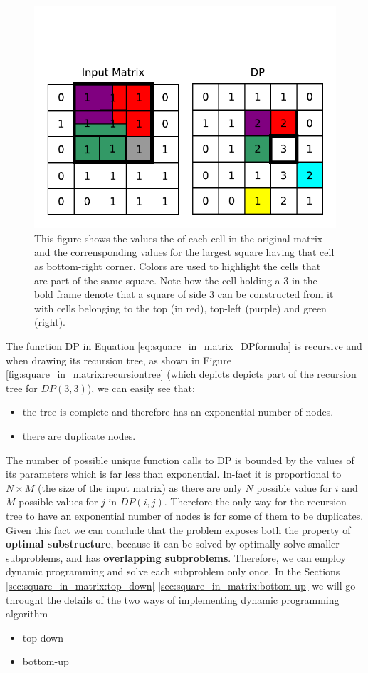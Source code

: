 \begin{figure}
	\centering
	\label{fig:square_in_matrix:square_DP_example}
	\includegraphics[]{sources/square_in_matrix/images/square_DP_example}
	\caption{This figure shows the values the of each cell in the original matrix and the
	corrensponding values for the largest square having that cell as bottom-right corner. Colors are
	used to highlight the cells that are part of the same square. Note how the cell holding a $3$ in
	the bold frame denote that a square of side $3$ can be constructed from it with cells belonging
	to the top (in red), top-left (purple) and green (right). }
\end{figure}

The function DP in Equation \ref{eq:square_in_matrix_DPformula} is recursive and when drawing its
recursion tree, as shown in Figure \ref{fig:square_in_matrix:recursiontree} (which depicts depicts
part of the recursion tree for $DP(3,3)$),  we can easily see that:
\begin{itemize}
	\item the tree is complete and therefore has an exponential number of nodes.
	\item there are duplicate nodes.
\end{itemize} 
The number of possible unique function calls to DP is bounded by the values of its parameters which
is far less than exponential. In-fact it is proportional to $N \times M$ (the size of the input
matrix) as there are only $N$ possible value for $i$ and $M$ possible values for $j$ in $DP(i,j)$.
Therefore the only way for the recursion tree to have an exponential number of nodes is for some of
them to be duplicates. Given this fact we can conclude that the problem exposes both the property of
\textbf{optimal substructure}, because it can be solved by optimally solve smaller subproblems, and
has \textbf{overlapping subproblems}. Therefore, we can employ dynamic programming and solve each
subproblem only once. In the Sections \ref{sec:square_in_matrix:top_down}
\ref{sec:square_in_matrix:bottom-up} we will go throught the details of the two ways of implementing
dynamic programming algorithm
\begin{itemize}
	\item top-down 
	\item bottom-up
\end{itemize}

